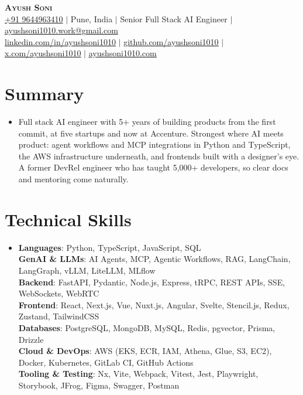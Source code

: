 \documentclass[letterpaper,10pt]{article}
\begin{document}
\begin{center}
  {\Huge\bfseries\scshape Ayush Soni}\\[7pt]
  \href{tel:+919644963410}{+91 9644963410} $|$
  Pune, India $|$
  Senior Full Stack AI Engineer $|$
  \href{mailto:ayushsoni1010.work@gmail.com}{ayushsoni1010.work@gmail.com}\\[3pt]
  \href{https://linkedin.com/in/ayushsoni1010}{\underline{linkedin.com/in/ayushsoni1010}} $|$
  \href{https://github.com/ayushsoni1010}{\underline{github.com/ayushsoni1010}} $|$
  \href{https://x.com/ayushsoni1010}{\underline{x.com/ayushsoni1010}} $|$
  \href{https://ayushsoni1010.com}{\underline{ayushsoni1010.com}}
\end{center}
\vspace{-8pt}

\section{Summary}
\begin{itemize}[leftmargin=0.15in, label={}, topsep=0pt, parsep=0pt]
\item {Full stack AI engineer with 5+ years of building products from the first commit, at five startups and now at Accenture. Strongest where AI meets product: agent workflows and MCP integrations in Python and TypeScript, the AWS infrastructure underneath, and frontends built with a designer’s eye. A former DevRel engineer who has taught 5,000+ developers, so clear docs and mentoring come naturally.}
\end{itemize}

\section{Technical Skills}
\begin{itemize}[leftmargin=0.15in, label={}, topsep=0pt, parsep=0pt]
\item
  \textbf{Languages}: \hfill Python, TypeScript, JavaScript, SQL \\[2pt]
  \textbf{GenAI \& LLMs}: \hfill AI Agents, MCP, Agentic Workflows, RAG, LangChain, LangGraph, vLLM, LiteLLM, MLflow \\[2pt]
  \textbf{Backend}: \hfill FastAPI, Pydantic, Node.js, Express, tRPC, REST APIs, SSE, WebSockets, WebRTC \\[2pt]
  \textbf{Frontend}: \hfill React, Next.js, Vue, Nuxt.js, Angular, Svelte, Stencil.js, Redux, Zustand, TailwindCSS \\[2pt]
  \textbf{Databases}: \hfill PostgreSQL, MongoDB, MySQL, Redis, pgvector, Prisma, Drizzle \\[2pt]
  \textbf{Cloud \& DevOps}: \hfill AWS (EKS, ECR, IAM, Athena, Glue, S3, EC2), Docker, Kubernetes, GitLab CI, GitHub Actions \\[2pt]
  \textbf{Tooling \& Testing}: \hfill Nx, Vite, Webpack, Vitest, Jest, Playwright, Storybook, JFrog, Figma, Swagger, Postman
\end{itemize}
\end{document}
